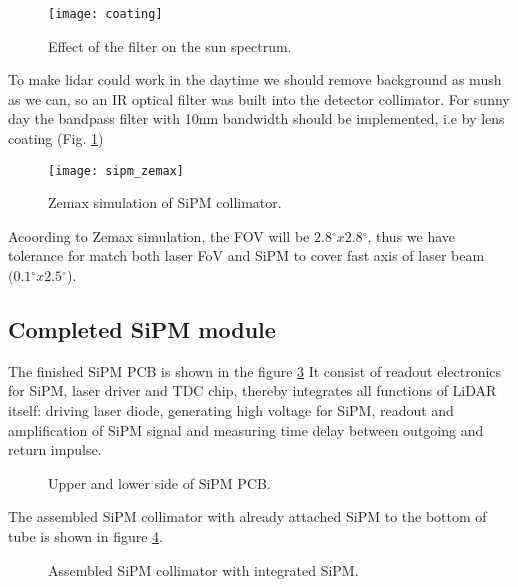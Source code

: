 \begin{figure}[H]
\texttt{[image: coating]}
\caption{Effect of the filter on the sun spectrum.}
\label{fig:coating}
\end{figure}

To make lidar could work in the daytime we should remove background as mush as we can, so an IR optical filter was built into the detector collimator. For sunny day the bandpass filter with 10nm bandwidth should be implemented, i.e by lens coating (Fig. \ref{fig:coating})



\begin{figure}[H]
\texttt{[image: sipm\_zemax]}
\caption{Zemax simulation of SiPM collimator.}
\label{fig:sipm_pde}
\end{figure}

Acoording to Zemax simulation, the FOV will be $2.8{^\circ}x2.8{^\circ}$,
thus we have tolerance for match both laser FoV and SiPM to cover fast axis of laser beam $(0.1{^\circ}x2.5{^\circ}$).



\subsection{Completed SiPM module}

The finished SiPM PCB is shown in the figure \ref{fig:sipm_PCB}
It consist of readout electronics for SiPM, laser driver and TDC chip, thereby integrates all functions of LiDAR itself: driving laser diode, generating high voltage for SiPM, readout and amplification of SiPM signal and measuring time delay between outgoing and return impulse.

\begin{figure}[h]
  \caption{Upper and lower side of SiPM PCB.}%
\label{fig:sipm_PCB} %
\end{figure}

The assembled SiPM collimator with already attached SiPM to the bottom of tube is shown in figure \ref{fig:sipm_collimator}.
\begin{figure}[h]
  \caption{Assembled SiPM collimator with integrated SiPM.}%
\label{fig:sipm_collimator} %
\end{figure}





